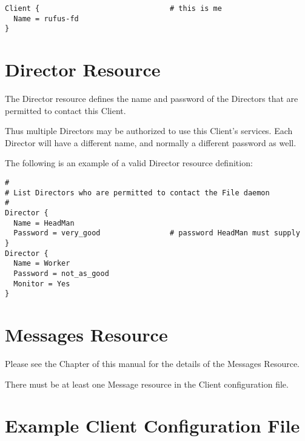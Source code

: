 \footnotesize
\begin{verbatim}
Client {                              # this is me
  Name = rufus-fd
}
\end{verbatim}
\normalsize

\section{Director Resource}
\label{ClientResourceDirector}

The Director resource defines the name and password of the Directors that are
permitted to contact this Client.





Thus multiple Directors may be authorized to use this Client's services. Each
Director will have a different name, and normally a different password as
well.

The following is an example of a valid Director resource definition:

\footnotesize
\begin{verbatim}
#
# List Directors who are permitted to contact the File daemon
#
Director {
  Name = HeadMan
  Password = very_good                # password HeadMan must supply
}
Director {
  Name = Worker
  Password = not_as_good
  Monitor = Yes
}
\end{verbatim}
\normalsize

\section{Messages Resource}
\label{MessagesResource3}

Please see the
 Chapter of this
manual for the details of the Messages Resource.

There must be at least one Message resource in the Client configuration file.

\section{Example Client Configuration File}
\label{SampleClientConfiguration}


